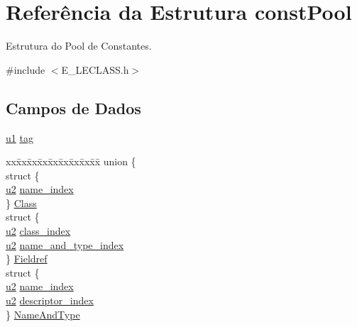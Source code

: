 \hypertarget{structconst_pool}{}\section{Referência da Estrutura const\+Pool}
\label{structconst_pool}


Estrutura do Pool de Constantes.  




{\ttfamily \#include $<$E\+\_\+\+L\+E\+C\+L\+A\+S\+S.\+h$>$}

\subsection*{Campos de Dados}
\begin{DoxyCompactItemize}
\item 
\hyperlink{_e___l_e_c_l_a_s_s_8h_a216a9f8b04b4f0af84a4ca9d1d85a6ca}{u1} \hyperlink{structconst_pool_a876197bb013e214c071ab56d1de8ed25}{tag}
\item 
\begin{tabbing}
xx\=xx\=xx\=xx\=xx\=xx\=xx\=xx\=xx\=\kill
union \{\\
\>struct \{\\
\>\>\hyperlink{_e___l_e_c_l_a_s_s_8h_a5f223212eef04d10a4550ded680cb1cf}{u2} \hyperlink{structconst_pool_af3f5f8cd6fcae23720d11786466944e1}{name\_index}\\
\>\} \hyperlink{structconst_pool_a3735adf769a89a8579d9c729d9ea852b}{Class}\\
\>struct \{\\
\>\>\hyperlink{_e___l_e_c_l_a_s_s_8h_a5f223212eef04d10a4550ded680cb1cf}{u2} \hyperlink{structconst_pool_ac2f1017863a461470285ceffa2487892}{class\_index}\\
\>\>\hyperlink{_e___l_e_c_l_a_s_s_8h_a5f223212eef04d10a4550ded680cb1cf}{u2} \hyperlink{structconst_pool_a3dde2ae699efaa1736b684038ea4f3de}{name\_and\_type\_index}\\
\>\} \hyperlink{structconst_pool_a2d445b84752ddea1db4ef9f3ce2fee02}{Fieldref}\\
\>struct \{\\
\>\>\hyperlink{_e___l_e_c_l_a_s_s_8h_a5f223212eef04d10a4550ded680cb1cf}{u2} \hyperlink{structconst_pool_af3f5f8cd6fcae23720d11786466944e1}{name\_index}\\
\>\>\hyperlink{_e___l_e_c_l_a_s_s_8h_a5f223212eef04d10a4550ded680cb1cf}{u2} \hyperlink{structconst_pool_a09a23db7ae9a3429931f2a5447f9f7fe}{descriptor\_index}\\
\>\} \hyperlink{structconst_pool_a727268ed0e1405a5eaab1aa5ad3cba74}{NameAndType}\\

\end{tabbing}
\end{DoxyCompactItemize}
